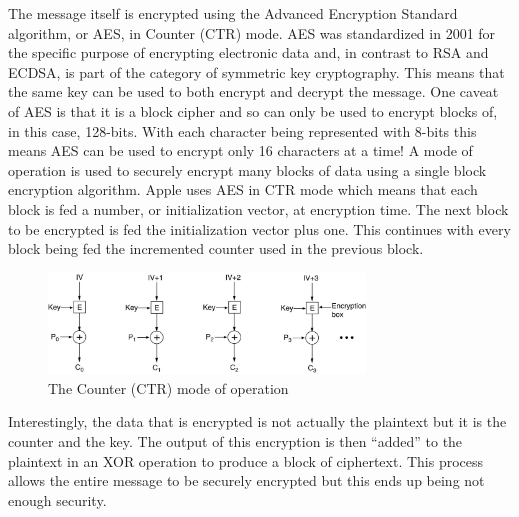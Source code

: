 The message itself is encrypted using the Advanced Encryption Standard
algorithm, or AES, in Counter (CTR) mode.  AES was standardized in 2001 for the
specific purpose of encrypting electronic data and, in contrast to RSA and
ECDSA, is part of the category of symmetric key cryptography\cite{trappe}.  This means that
the same key can be used to both encrypt and decrypt the message.  One caveat
of AES is that it is a block cipher and so can only be used to encrypt blocks
of, in this case, 128-bits.  With each character being represented with 8-bits
this means AES can be used to encrypt only 16 characters at a time!  A mode of
operation is used to securely encrypt many blocks of data using a single block
encryption algorithm.  Apple uses AES in CTR mode which means that each block
is fed a number, or initialization vector, at encryption time\cite{apple}\cite{trappe}.  
The next block
to be encrypted is fed the initialization vector plus one.  This continues with
every block being fed the incremented counter used in the previous block.

\begin{figure}[h!]
    \caption{The Counter (CTR) mode of operation\cite{ctr}}
    \centering
        \includegraphics[width=0.75\textwidth]{ctr.jpg}
\end{figure}

Interestingly, the data that is encrypted is not actually the plaintext but it
is the counter and the key.  The output of this encryption is then ``added'' to
the plaintext in an XOR operation to produce a block of ciphertext.  This
process allows the entire message to be securely encrypted but this ends up
being not enough security.

